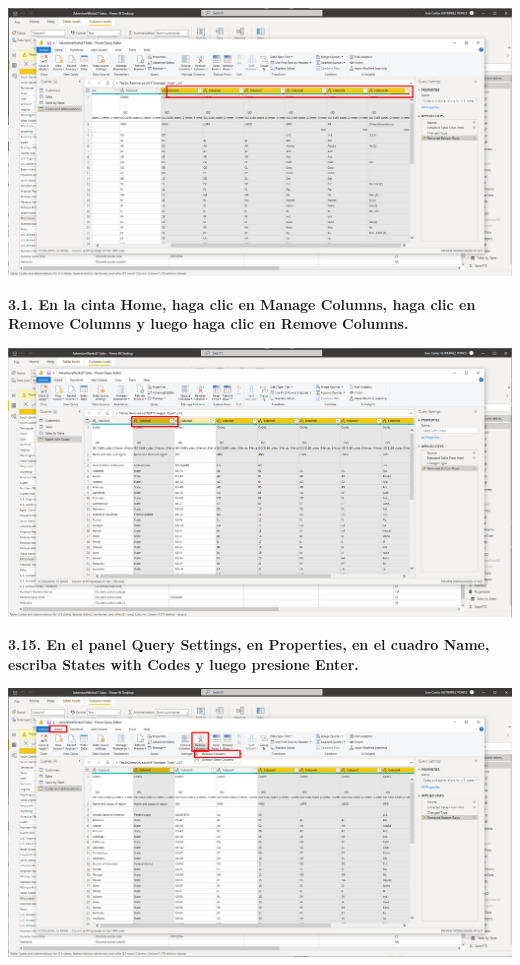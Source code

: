 \documentclass{article}
\begin{document}
    \begin{center}
		\includegraphics[width=14cm]{./images/61} 
	\end{center}

\textbf{3.1. En la cinta \textbf{Home}, haga clic en \textbf{Manage Columns}, haga clic en \textbf{Remove Columns} y luego haga clic en \textbf{Remove Columns}.}

    \begin{center}
		\includegraphics[width=14cm]{./images/62} 
	\end{center}
\newpage
\textbf{3.15. En el panel \textbf{Query Settings}, en \textbf{Properties}, en el cuadro \textbf{Name}, escriba \textbf{States with Codes} y luego presione \textbf{Enter}.}

    \begin{center}
		\includegraphics[width=14cm]{./images/63} 
	\end{center}
\end{document}
